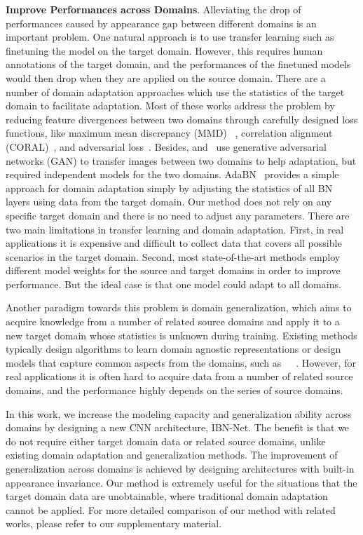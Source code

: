 \documentclass[runningheads]{llncs}
\begin{document}
\textbf{Improve Performances across Domains}.
Alleviating the drop of performances caused by appearance gap between different domains is an important problem.
One natural approach is to use transfer learning such as finetuning the model on the target domain.
However, this requires human annotations of the target domain, and the performances of the finetuned models would then drop when they are applied on the source domain.
There are a number of domain adaptation approaches which use the statistics of the target domain to facilitate adaptation.
Most of these works address the problem by reducing feature divergences between two domains through carefully designed loss functions, like maximum mean discrepancy (MMD) ~\cite{tzeng2014deep,long2015learning}, correlation alignment (CORAL)~\cite{sun2016deep}, and adversarial loss~\cite{tzeng2017adversarial,hoffman2016fcns}.
Besides, \cite{sankaranarayanan2017unsupervised} and~\cite{hoffman2017cycada} use generative adversarial networks (GAN) to transfer images between two domains to help adaptation, but required independent models for the two domains.
AdaBN~\cite{li2016revisiting} provides a simple approach for domain adaptation simply by adjusting the statistics of all BN layers using data from the target domain.
Our method does not rely on any specific target domain and there is no need to adjust any parameters.
There are two main limitations in transfer learning and domain adaptation.
First, in real applications it is expensive and difficult to collect data that covers all possible scenarios in the target domain.
Second, most state-of-the-art methods employ different model weights for the source and target domains in order to improve performance.
But the ideal case is that one model could adapt to all domains.

Another paradigm towards this problem is domain generalization, which aims to acquire knowledge from a number of related source domains and apply it to a new target domain whose statistics is unknown during training.
Existing methods typically design algorithms to learn domain agnostic representations or design models that capture common aspects from the domains, such as~\cite{khosla2012undoing}~\cite{muandet2013domain}~\cite{ghifary2015domain}.
However, for real applications it is often hard to acquire data from a number of related source domains, and the performance highly depends on the series of source domains.

In this work, we increase the modeling capacity and generalization ability across domains by designing a new CNN architecture, IBN-Net.
The benefit is that we do not require either target domain data or related source domains, unlike existing domain adaptation and generalization methods.
The improvement of generalization across domains is achieved by designing architectures with built-in appearance invariance.
Our method is extremely useful for the situations that the target domain data are unobtainable, where traditional domain adaptation cannot be applied.
For more detailed comparison of our method with related works, please refer to our supplementary material.
\end{document}
